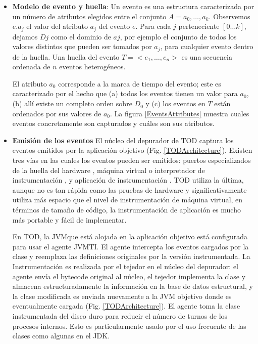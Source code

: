 \documentclass[12pt,legalpaper]{report}
\begin{document}
\begin{itemize}

	\item \textbf{Modelo de evento y huella}: Un evento es una estructura caracterizada por un número de atributos elegidos entre el conjunto $A={a_0,\dots ,a_k}$. Observemos $e.a_j$ el valor del atributo $a_j$ del evento $e$.  Para cada $j$ perteneciente $[0\dots k]$, dejamos $Dj$ como el dominio de $aj$, por ejemplo el conjunto de todos los valores distintos que pueden ser tomados por $a_j$, para cualquier evento dentro de la huella.  Una huella del evento $T=<e_{1},\dots ,e_{n}>$ es una secuencia ordenada de $n$ eventos heterogéneos.

El atributo $a_{0}$ corresponde a la marca de tiempo del evento; este es caracterizado por el hecho que (a) todos los eventos tienen un valor para $a_{0}$, (b) allí existe un completo orden sobre $D_{0}$ y (c) los eventos en $T$ están ordenados por sus valores de $a_{0}$. La figura \ref{EventsAttributes} muestra cuales eventos concretamente son capturados y cuáles son sus atributos.

	\item \textbf{Emisión de los eventos} El núcleo del depurador de TOD captura los eventos emitidos por la aplicación objetivo (Fig. \ref{TODArchitecture}).  Existen tres vías en las cuales los eventos pueden ser emitidos:  puertos especializados de la huella del hardware \cite{rtmdt},  máquina virtual o interpretador de instrumentación \cite{rooi}, y aplicación de instrumentación \cite{zstep,odb}.  TOD utiliza la última, aunque no es tan rápida como las pruebas de hardware y significativamente utiliza más espacio que el nivel de instrumentación de máquina virtual, en términos de tamaño de código, la instrumentación de aplicación es mucho más portable y fácil de implementar.

En TOD, la JVM\footnotemark[1] que está alojada en la aplicación objetivo está configurada para usar el agente  JVMTI\footnotemark[2] .  El agente intercepta los eventos cargados por la clase y reemplaza las definiciones originales por la versión instrumentada.  La Instrumentación es realizada por el tejedor en el núcleo del depurador:  el agente envía el bytecode original al núcleo,  el tejedor implementa la clase y almacena estructuradamente la información en la base de datos estructural, y la clase modificada es enviada nuevamente a la JVM objetivo donde es eventualmente cargada (Fig. \ref{TODArchitecture}).  El agente toma la clase instrumentada del disco duro para reducir el número de turnos de los procesos internos.  Esto es  particularmente usado por el uso frecuente de las clases como algunas en el JDK.


\end{itemize}
\end{document}

